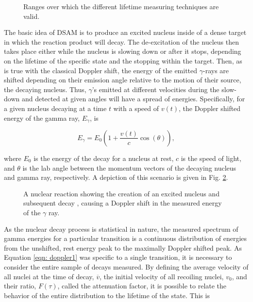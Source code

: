 \begin{figure}
\label{fig: lifetimeRanges}
\caption{Ranges over which the different lifetime measuring techniques are valid.}
\end{figure}


The basic idea of DSAM is to produce an excited nucleus inside of a dense target in which the reaction product will decay. The de-excitation of the nucleus then takes place either while the nucleus is slowing down or after it stops, depending on the lifetime of the specific state and the stopping within the target. Then, as is true with the classical Doppler shift, the energy of the emitted $\gamma$-rays are shifted depending on their emission angle relative to the motion of their source, the decaying nucleus. Thus, $\gamma$'s emitted at different velocities during the slow-down and detected at given angles will have a spread of energies. Specifically, for a given nucleus decaying at a time $t$ with a speed of $v(t)$, the Doppler shifted energy of the gamma ray, $E_{\gamma}$, is 

\begin{equation}
E_{\gamma} = E_{0} \left(1 + \dfrac{v(t)}{c} \cos (\theta)   \right),
\label{eqn: doppler1}
\end{equation}

\noindent where $E_{0}$ is the energy of the decay for a nucleus at rest, $c$ is the speed of light, and $\theta$ is the lab angle between the momentum vectors of the decaying nucleus and gamma ray, respectively. A depiction of this scenario is given in Fig. \ref{fig: decay}.

\begin{figure}
\label{fig: decay}
\caption{A nuclear reaction showing the creation of an excited nucleus and subsequent decay , causing a Doppler shift in the measured energy of the $\gamma$ ray.}
\end{figure}


As the nuclear decay process is statistical in nature, the measured spectrum of gamma energies for a particular transition is a continuous distribution of energies from the unshifted, rest energy peak to the maximally Doppler shifted peak. As Equation \ref{eqn: doppler1} was specific to a single transition, it is necessary to consider the entire sample of decays measured. By defining the average velocity of all nuclei at the time of decay, $\overline{v}$, the initial velocity of all recoiling nuclei, $v_{0}$, and their ratio, $F(\tau)$, called the attenuation factor, it is possible to relate the behavior of the entire distribution to the lifetime of the state. This is 

